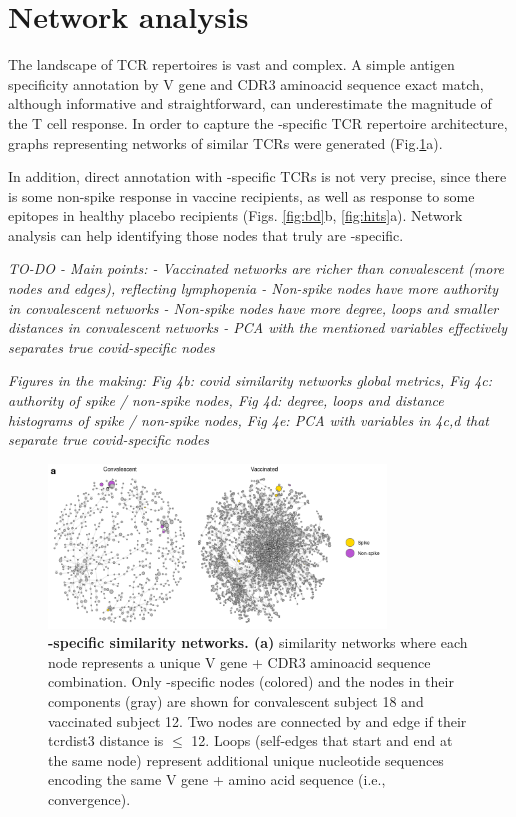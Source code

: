 \section*{Network analysis}

The landscape of TCR repertoires is vast and complex. A simple antigen specificity annotation by V gene and CDR3 aminoacid sequence exact match, although informative and straightforward, can underestimate the magnitude of the T cell response. In order to capture the \covid-specific TCR repertoire architecture, graphs representing networks of similar TCRs were generated (Fig.\ref{fig:nets}a).

In addition, direct annotation with \covid-specific TCRs is not very precise, since there is some non-spike response in vaccine recipients, as well as response to some \covid{} epitopes in healthy placebo recipients (Figs. \ref{fig:bd}b, \ref{fig:hits}a). Network analysis can help identifying those nodes that truly are \covid-specific.

\textit{TO-DO - Main points:
- Vaccinated networks are richer than convalescent (more nodes and edges), reflecting lymphopenia
- Non-spike nodes have more authority in convalescent networks
- Non-spike nodes have more degree, loops and smaller distances in convalescent networks
- PCA with the mentioned variables effectively separates true covid-specific nodes
}

\textit{Figures in the making:
Fig 4b: covid similarity networks global metrics,
Fig 4c: authority of spike / non-spike nodes,
Fig 4d: degree, loops and distance histograms of spike / non-spike nodes,
Fig 4e: PCA with variables in 4c,d that separate true covid-specific nodes}



\begin{figure}[t]
	\centering
	\includegraphics[width=0.8\textwidth,keepaspectratio]{figures/two_nets.png}
	\caption{\textbf{\covid-specific \TCRB{} similarity networks. (a)} \TCRB{} similarity networks where each node represents a unique V gene + CDR3 aminoacid sequence combination. Only \covid-specific nodes (colored) and the nodes in their components (gray) are shown for convalescent subject 18 and vaccinated subject 12. Two nodes are connected by and edge if their tcrdist3 distance is $\leq$ 12. Loops (self-edges that start and end at the same node) represent additional unique nucleotide sequences encoding the same V gene + amino acid sequence (i.e., convergence).}
	\label{fig:nets}
\end{figure}
